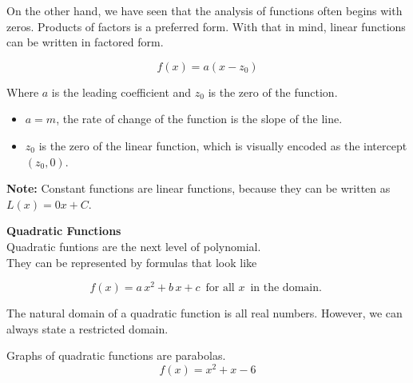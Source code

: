 \documentclass{ximera}
\begin{document}
On the other hand, we have seen that the analysis of functions often begins with zeros.  Products of factors is a preferred form.  With that in mind, linear functions can be written in factored form.


\[  f(x) = a (x - z_0)  \]

Where $a$ is the leading coefficient and $z_0$ is the zero of the function.





\begin{itemize}

\item $a = m$, the rate of change of the function is the slope of the line.

\item $z_0$ is the zero of the linear function, which is visually encoded as the intercept $(z_0, 0)$.

\end{itemize}



\textbf{Note:} Constant functions are linear functions, because they can be written as $L(x) = 0 x + C$. \\












\begin{template}  \textbf{\textcolor{blue!55!black}{Quadratic Functions}} \\



Quadratic funtions are the next level of polynomial. \\


They can be represented by formulas that look like


\[ f(x) = a \, x^2 + b \, x + c  \,  \text{ for all } x  \, \text{ in the domain. }   \]



\end{template}



The natural domain of a quadratic function is all real numbers.  However, we can always state a restricted domain.







Graphs of quadratic functions are parabolas. 
\[ f(x) = x^2 + x - 6\]
\end{document}
